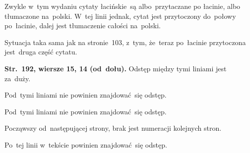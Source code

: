 \documentclass[a4paper,11pt]{article}
\begin{document}
\vspace{\spaceFour}



\start {} Zwykle w~tym wydaniu cytaty łacińskie~są
albo~przytaczane po łacinie, albo tłumaczone na~polski. W~tej linii
jednak, cytat jest przytoczony do~połowy po~łacinie, dalej jest
tłumaczenie całości na~polski.

\vspace{\spaceFour}



\start {} Sytuacja taka sama jak na stronie~103, z~tym,
że~teraz po~łacinie przytoczona jest~druga część cytatu.

\vspace{\spaceFour}



\start \textbf{Str.~192, wiersze 15, 14 (od~dołu).} Odstęp między tymi
liniami jest za~duży.

\vspace{\spaceFour}



\start {} Pod~tymi liniami nie powinien
znajdować~się odstęp.

\vspace{\spaceFour}



\start {} Pod~tymi liniami nie powinien
znajdować~się odstęp.

\vspace{\spaceFour}



\start {} Począwszy od~następującej strony, brak jest numeracji
kolejnych stron.

\vspace{\spaceFour}



\start {} Po~tej linii w~tekście powinien znajdować~się
odstęp.

\vspace{\spaceFour}





\end{document}
